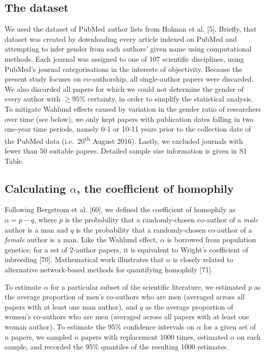 \documentclass[12pt,]{article}
\begin{document}
\hypertarget{the-dataset}{%
\subsection{The dataset}\label{the-dataset}}

We used the dataset of PubMed author lists from Holman et al. {[}5{]}.
Briefly, that dataset was created by downloading every article indexed
on PubMed and attempting to infer gender from each authors' given name
using computational methods. Each journal was assigned to one of 107
scientific disciplines, using PubMed's journal categorisations in the
interests of objectivity. Because the present study focuses on
co-authorship, all single-author papers were discarded. We also
discarded all papers for which we could not determine the gender of
every author with \({\ge}95\%\) certainty, in order to simplify the
statistical analysis. To mitigate Wahlund effects caused by variation in
the gender ratio of researchers over time (see below), we only kept
papers with publication dates falling in two one-year time periods,
namely 0-1 or 10-11 years prior to the collection date of the PubMed
data (i.e.~20\textsuperscript{th} August 2016). Lastly, we excluded
journals with fewer than 50 suitable papers. Detailed sample size
information is given in S1 Table.

\hypertarget{calculating-alpha-the-coefficient-of-homophily}{%
\subsection{\texorpdfstring{Calculating \(\alpha\), the coefficient of
homophily}{Calculating \textbackslash{}alpha, the coefficient of homophily}}\label{calculating-alpha-the-coefficient-of-homophily}}

Following Bergstrom et al. {[}60{]}, we defined the coefficient of
homophily as \(\alpha = p - q\), where \(p\) is the probability that a
randomly-chosen co-author of a \emph{male} author is a man and \(q\) is
the probability that a randomly-chosen co-author of a \emph{female}
author is a man. Like the Wahlund effect, \(\alpha\) is borrowed from
population genetics; for a set of 2-author papers, it is equivalent to
Wright's coefficient of inbreeding {[}70{]}. Mathematical work
illustrates that \(\alpha\) is closely related to alternative
network-based methods for quantifying homophily {[}71{]}.

To estimate \(\alpha\) for a particular subset of the scientific
literature, we estimated \(p\) as the average proportion of men's
co-authors who are men (averaged across all papers with at least one man
author), and \(q\) as the average proportion of women's co-authors who
are men (averaged across all papers with at least one woman author). To
estimate the 95\% confidence intervals on \(\alpha\) for a given set of
\(n\) papers, we sampled \(n\) papers with replacement 1000 times,
estimated \(\alpha\) on each sample, and recorded the 95\% quantiles of
the resulting 1000 estimates.
\end{document}
